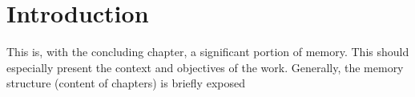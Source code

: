 \chapter{Introduction}
\label{Chap1}

This is, with the concluding chapter, a significant portion of memory. This should
especially present the context and objectives of the work. Generally, the memory structure (content
of chapters) is briefly exposed